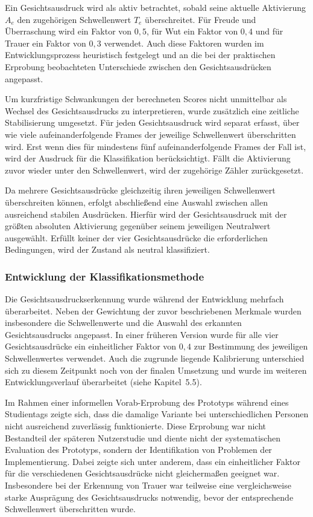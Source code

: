 \documentclass[intern]{cgMA}
\begin{document}
Ein Gesichtsausdruck wird als aktiv betrachtet, sobald seine aktuelle
Aktivierung $A_e$ den zugehörigen Schwellenwert $T_e$ überschreitet.
Für Freude und Überraschung wird ein Faktor von $0{,}5$, für Wut ein
Faktor von $0{,}4$ und für Trauer ein Faktor von $0{,}3$ verwendet.
Auch diese Faktoren wurden im Entwicklungsprozess heuristisch
festgelegt und an die bei der praktischen Erprobung beobachteten
Unterschiede zwischen den Gesichtsausdrücken angepasst.

Um kurzfristige Schwankungen der berechneten Scores nicht unmittelbar
als Wechsel des Gesichtsausdrucks zu interpretieren, wurde zusätzlich
eine zeitliche Stabilisierung umgesetzt. Für jeden Gesichtsausdruck
wird separat erfasst, über wie viele aufeinanderfolgende Frames der
jeweilige Schwellenwert überschritten wird. Erst wenn dies für
mindestens fünf aufeinanderfolgende Frames der Fall ist, wird der
Ausdruck für die Klassifikation berücksichtigt. Fällt die Aktivierung
zuvor wieder unter den Schwellenwert, wird der zugehörige Zähler
zurückgesetzt.

Da mehrere Gesichtsausdrücke gleichzeitig ihren jeweiligen
Schwellenwert überschreiten können, erfolgt abschließend eine Auswahl
zwischen allen ausreichend stabilen Ausdrücken. Hierfür wird der
Gesichtsausdruck mit der größten absoluten Aktivierung gegenüber seinem
jeweiligen Neutralwert ausgewählt. Erfüllt keiner der vier
Gesichtsausdrücke die erforderlichen Bedingungen, wird der Zustand als
neutral klassifiziert.

\subsubsection{Entwicklung der Klassifikationsmethode}

Die Gesichtsausdruckserkennung wurde während der Entwicklung mehrfach
überarbeitet. Neben der Gewichtung der zuvor beschriebenen Merkmale
wurden insbesondere die Schwellenwerte und die Auswahl des erkannten
Gesichtsausdrucks angepasst. In einer früheren Version wurde für alle
vier Gesichtsausdrücke ein einheitlicher Faktor von $0{,}4$ zur
Bestimmung des jeweiligen Schwellenwertes verwendet. Auch die
zugrunde liegende Kalibrierung unterschied sich zu diesem Zeitpunkt
noch von der finalen Umsetzung und wurde im weiteren
Entwicklungsverlauf überarbeitet (siehe Kapitel~5.5).

Im Rahmen einer informellen Vorab-Erprobung des Prototyps während eines
Studientags zeigte sich, dass die damalige Variante bei
unterschiedlichen Personen nicht ausreichend zuverlässig
funktionierte. Diese Erprobung war nicht Bestandteil der späteren
Nutzerstudie und diente nicht der systematischen Evaluation des
Prototyps, sondern der Identifikation von Problemen der
Implementierung. Dabei zeigte sich unter anderem, dass ein
einheitlicher Faktor für die verschiedenen Gesichtsausdrücke nicht
gleichermaßen geeignet war. Insbesondere bei der Erkennung von Trauer
war teilweise eine vergleichsweise starke Ausprägung des
Gesichtsausdrucks notwendig, bevor der entsprechende Schwellenwert
überschritten wurde.
\end{document}

